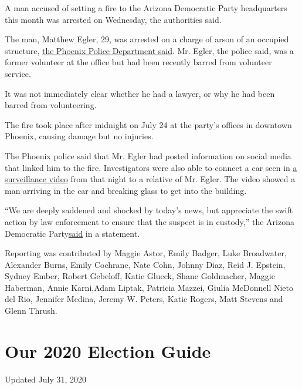 A man accused of setting a fire to the Arizona Democratic Party
headquarters this month was arrested on Wednesday, the authorities said.

The man, Matthew Egler, 29, was arrested on a charge of arson of an
occupied structure,
\href{https://www.phoenix.gov/newsroom/police/1428}{the Phoenix Police
Department said}. Mr. Egler, the police said, was a former volunteer at
the office but had been recently barred from volunteer service.

It was not immediately clear whether he had a lawyer, or why he had been
barred from volunteering.

The fire took place after midnight on July 24 at the party's offices in
downtown Phoenix, causing damage but no injuries.

The Phoenix police said that Mr. Egler had posted information on social
media that linked him to the fire. Investigators were also able to
connect a car seen in \href{https://youtu.be/MwKENYmA6fs}{a surveillance
video} from that night to a relative of Mr. Egler. The video showed a
man arriving in the car and breaking glass to get into the building.

``We are deeply saddened and shocked by today's news, but appreciate the
swift action by law enforcement to ensure that the suspect is in
custody,'' the Arizona Democratic
Party\href{https://azdem.org/joint-statement-arizona-democratic-party-and-maricopa-county-democratic-party-react-to-new-announcement-in-investigation/}{said}
in a statement.

Reporting was contributed by Maggie Astor, Emily Badger, Luke
Broadwater, Alexander Burns, Emily Cochrane, Nate Cohn, Johnny Diaz,
Reid J. Epstein, Sydney Ember, Robert Gebeloff, Katie Glueck, Shane
Goldmacher, Maggie Haberman, Annie Karni,Adam Liptak, Patricia Mazzei,
Giulia McDonnell Nieto del Rio, Jennifer Medina, Jeremy W. Peters, Katie
Rogers, Matt Stevens and Glenn Thrush.

\hypertarget{our-2020-election-guide}{%
\section{Our 2020 Election Guide}\label{our-2020-election-guide}}

Updated July 31, 2020

